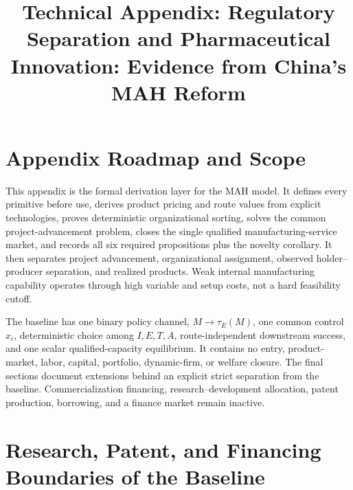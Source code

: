 \documentclass[11pt]{article}
\title{Technical Appendix: Regulatory Separation and Pharmaceutical Innovation: Evidence from China's MAH Reform}
\author{}
\date{}
\newcommand{\1}{\mathbf{1}}
\begin{document}
\maketitle
\thispagestyle{plain}

\newpage
\tableofcontents
\newpage
\small

\section{Appendix Roadmap and Scope}
\label{sec:appendix-roadmap}

This appendix is the formal derivation layer for the MAH model. It
defines every primitive before use, derives product pricing and route values
from explicit technologies, proves deterministic organizational sorting,
solves the common project-advancement problem, closes the single qualified
manufacturing-service market, and records all six required propositions plus
the novelty corollary. It then separates project advancement, organizational
assignment, observed holder--producer separation, and realized products.
Weak internal manufacturing capability operates through high variable and
setup costs, not a hard feasibility cutoff.

The baseline has one binary policy channel, \(M\to\tau_E(M)\), one common
control \(x_i\), deterministic choice among \(I,E,T,A\), route-independent
downstream success, and one scalar qualified-capacity equilibrium. It contains
no entry, product-market, labor, capital, portfolio, dynamic-firm, or welfare
closure. The final sections document extensions behind an explicit strict
separation from the baseline. Commercialization financing,
research--development allocation, patent production, borrowing, and a finance
market remain inactive.












\section{Research, Patent, and Financing Boundaries of the Baseline}
\label{sec:appendix-research-development-boundary}
\end{document}
